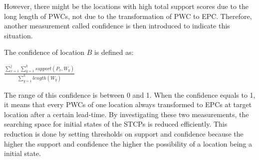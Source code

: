 \documentclass{acm_proc_article-sp}
\begin{document}
\newline 
However, there might be the locations with high total support scores due to the long length of PWCs, not due to the transformation of PWC to EPC. Therefore, another measurement called confidence is then introduced to indicate this situation. 
\begin{mydef}
\label{def:confidence}
The confidence of location $B$ is defined as: 
\begin{center}
    $ \frac{\sum_{x=1}^{j} \sum_{y=1}^{k} support(P_x,W_y)}{\sum_{y=1}^{k} length(W_y)} $
\end{center}
\end{mydef}
The range of this confidence is between 0 and 1. When the confidence equals to 1, it means that every PWCs of one location always transformed to EPCs at target location after a certain lead-time. 
\newline
By investigating these two measurements, the searching space for initial states of the STCPs is reduced efficiently. This reduction is done by setting thresholds on support and confidence because the higher the support and confidence the higher the possibility of a location being a initial state.
\end{document}
